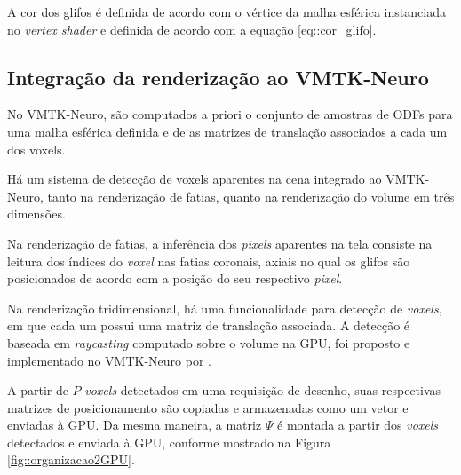 \documentclass[
    12pt,                %
    oneside,            %
    a4paper,            %
    english,            %
    french,                %
    spanish,            %
    brazil                %
    ]{abntex2}
\begin{document}
A cor dos glifos é definida de acordo com o vértice da malha esférica instanciada no \textit{vertex shader} e definida de acordo com a equação \ref{eq::cor_glifo}.






\subsection{Integração da renderização ao VMTK-Neuro}

No VMTK-Neuro, são computados a priori o conjunto de amostras de ODFs para uma malha esférica definida e de as matrizes de translação associados a cada um dos voxels.

Há um sistema de detecção de voxels aparentes na cena integrado ao VMTK-Neuro, tanto na renderização de fatias, quanto na renderização do volume em três dimensões.

Na renderização de fatias, a inferência dos \textit{pixels} aparentes na tela consiste na leitura dos índices do \textit{voxel} nas fatias coronais, axiais no qual os glifos são posicionados de acordo com a posição do seu respectivo \textit{pixel}.

Na renderização tridimensional, há uma funcionalidade para detecção de \textit{voxels}, em que cada um possui uma matriz de translação associada. A detecção é baseada em \textit{raycasting} computado sobre o volume na GPU, foi proposto e implementado no VMTK-Neuro por .

A partir de $P$ \textit{voxels} detectados em uma requisição de desenho, suas respectivas matrizes de posicionamento são copiadas e armazenadas como um vetor e enviadas à GPU. Da mesma maneira, a matriz $\Psi$ é montada a partir dos \textit{voxels} detectados e enviada à GPU, conforme mostrado na Figura \ref{fig::organizacao2GPU}.
\end{document}
